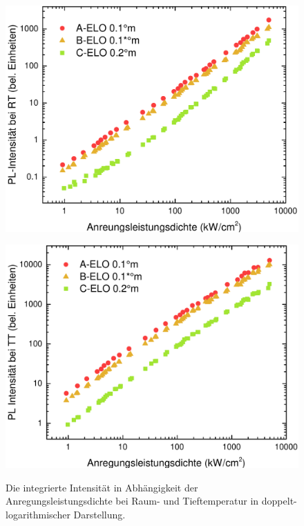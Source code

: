 \begin{figure}[htb]
  \centering
  \begin{minipage}[t]{0.49\textwidth}
    \centering
    \includegraphics[width=\textwidth]{Bilder/TS4045/intRT.pdf}
		\caption{}
    \label{fig:eloINTrt}
  \end{minipage}
	\hfill
  \begin{minipage}[t]{0.49\textwidth}
    \centering
    \includegraphics[width=\linewidth]{Bilder/TS4045/intTT.pdf}
    \label{fig:eloINTtt}
		\caption{}
  \end{minipage}
	\caption{Die integrierte Intensität in Abhängigkeit der Anregungsleistungsdichte bei Raum- und Tieftemperatur in doppelt-logarithmischer Darstellung. }
\end{figure}
